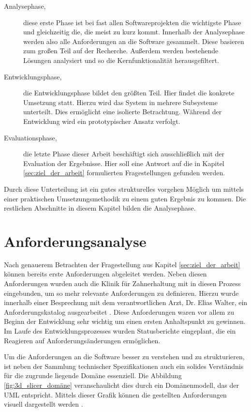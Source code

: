 \begin{description}
	\item[Analysephase,] diese erste Phase ist bei fast allen Softwareprojekten die
		wichtigste Phase und gleichzeitig die, die meist zu kurz kommt. Innerhalb der
		Analysephase werden also alle Anforderungen an die Software gesammelt. Diese
		basieren zum großen Teil auf der Recherche. Außerdem werden bestehende Lösungen
		analysiert und so die Kernfunktionalität herausgefiltert.

	\item[Entwicklungsphase,] die Entwicklungsphase bildet den größten Teil. Hier
		findet die konkrete Umsetzung statt. Hierzu wird das System in mehrere Subsysteme
		unterteilt. Dies ermöglicht eine isolierte Betrachtung. Während der Entwicklung
		wird ein prototypischer Ansatz verfolgt.

	\item[Evaluationsphase,] die letzte Phase dieser Arbeit beschäftigt sich ausschließlich
		mit der Evaluation der Ergebnisse. Hier soll eine Antwort auf die in Kapitel
		\ref{sec:ziel_der_arbeit} formulierten Fragestellungen gefunden werden.
\end{description}

Durch diese Unterteilung ist ein gutes strukturelles vorgehen Möglich um mittels
einer praktischen Umsetzungsmethodik zu einem guten Ergebnis zu kommen. Die
restlichen Abschnitte in diesem Kapitel bilden die Analysephase.

\section{Anforderungsanalyse}
\label{sec:anforderungsanalyse} Nach genauerem Betrachten der Fragestellung aus
Kapitel \ref{sec:ziel_der_arbeit} können bereits erste Anforderungen abgeleitet
werden. Neben diesen Anforderungen wurden auch die Klinik für Zahnerhaltung mit in
diesen Prozess eingebunden, um so mehr relevante Anforderungen zu definieren. Hierzu
wurde innerhalb einer Besprechung mit dem verantwortlichen Arzt, Dr. Elias Walter,
ein Anforderungskatalog ausgearbeitet \citep[vgl.][]{walter2025}. Diese
Anforderungen waren vor allem zu Beginn der Entwicklung sehr wichtig um einen
ersten Anhaltspunkt zu gewinnen. Im Laufe des Entwicklungsprozesses wurden Statusberichte
eingeplant, die ein Reagieren auf Anforderungsänderungen ermöglichen.

Um die Anforderungen an die Software besser zu verstehen und zu strukturieren, ist
neben der Sammlung technischer Spezifikationen auch ein solides Verständnis für die
zugrunde liegende Domäne essenziell. Die Abbildung \ref{fig:3d_slicer_domäne}
veranschaulicht dies durch ein Domänenmodell, das der \ac{UML} entspricht. Mittels
dieser Grafik können die gestellten Anforderungen visuell dargestellt werden \citep[vgl.][]{walter2025}.

